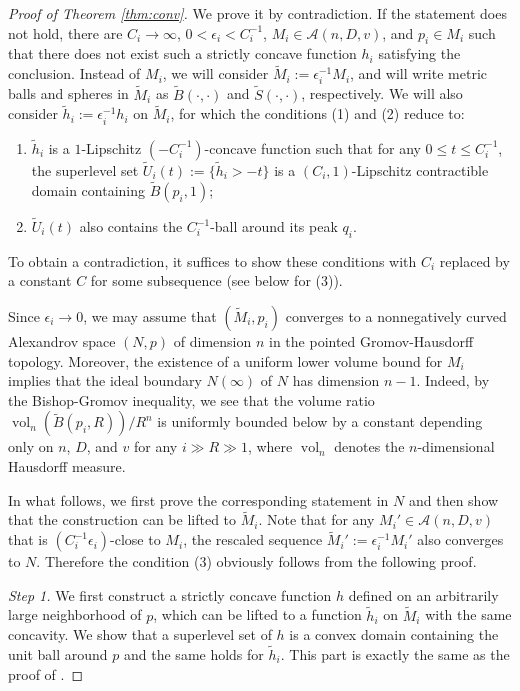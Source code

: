 \documentclass[a4paper,12pt]{amsart}
\theoremstyle{plain}
\theoremstyle{definition}
\numberwithin{thm}{section}
\numberwithin{equation}{section}
\DeclareMathOperator{\vol}{vol}
\newcommand{\step}[1]{\medskip\noindent\textit{#1.}}
\begin{document}
\begin{proof}[Proof of Theorem \ref{thm:conv}]
We prove it by contradiction.
If the statement does not hold, there are $C_i\to\infty$, $0<\epsilon_i<C_i^{-1}$, $M_i\in\mathcal A(n,D,v)$, and $p_i\in M_i$ such that there does not exist such a strictly concave function $h_i$ satisfying the conclusion.
Instead of $M_i$, we will consider $\tilde M_i:=\epsilon_i^{-1}M_i$, and will write metric balls and spheres in $\tilde M_i$ as $\tilde B(\cdot,\cdot)$ and $\tilde S(\cdot,\cdot)$, respectively.
We will also consider $\tilde h_i:=\epsilon_i^{-1}h_i$ on $\tilde M_i$, for which the conditions (1) and (2) reduce to:
\begin{enumerate}
\item $\tilde h_i$ is a $1$-Lipschitz $(-C_i^{-1})$-concave function such that for any $0\le t\le C_i^{-1}$, the superlevel set $\tilde U_i(t):=\{\tilde h_i>-t\}$ is a $(C_i,1)$-Lipschitz contractible domain containing $\tilde B(p_i,1)$;
\item $\tilde U_i(t)$ also contains the $C_i^{-1}$-ball around its peak $q_i$.
\end{enumerate}
To obtain a contradiction, it suffices to show these conditions with $C_i$ replaced by a constant $C$ for some subsequence (see below for (3)).

Since $\epsilon_i\to 0$, we may assume that $(\tilde M_i,p_i)$ converges to a nonnegatively curved Alexandrov space $(N,p)$ of dimension $n$ in the pointed Gromov-Hausdorff topology.
Moreover, the existence of a uniform lower volume bound for $M_i$ implies that the ideal boundary $N(\infty)$ of $N$ has dimension $n-1$.
Indeed, by the Bishop-Gromov inequality, we see that the volume ratio $\vol_n(\tilde B(p_i,R))/R^n$ is uniformly bounded below by a constant depending only on $n$, $D$, and $v$ for any $i\gg R\gg 1$, where $\vol_n$ denotes the $n$-dimensional Hausdorff measure.

In what follows, we first prove the corresponding statement in $N$ and then show that the construction can be lifted to $\tilde M_i$.
Note that for any $M_i'\in\mathcal A(n,D,v)$ that is $(C_i^{-1}\epsilon_i)$-close to $M_i$, the rescaled sequence $\tilde M_i':=\epsilon_i^{-1}M_i'$ also converges to $N$.
Therefore the condition (3) obviously follows from the following proof.

\step{Step 1}
We first construct a strictly concave function $h$ defined on an arbitrarily large neighborhood of $p$, which can be lifted to a function $\tilde h_i$ on $\tilde M_i$ with the same concavity.
We show that a superlevel set of $h$ is a convex domain containing the unit ball around $p$ and the same holds for $\tilde h_i$.
This part is exactly the same as the proof of \cite[4.3]{PP:ext}.


\end{proof}
\end{document}

